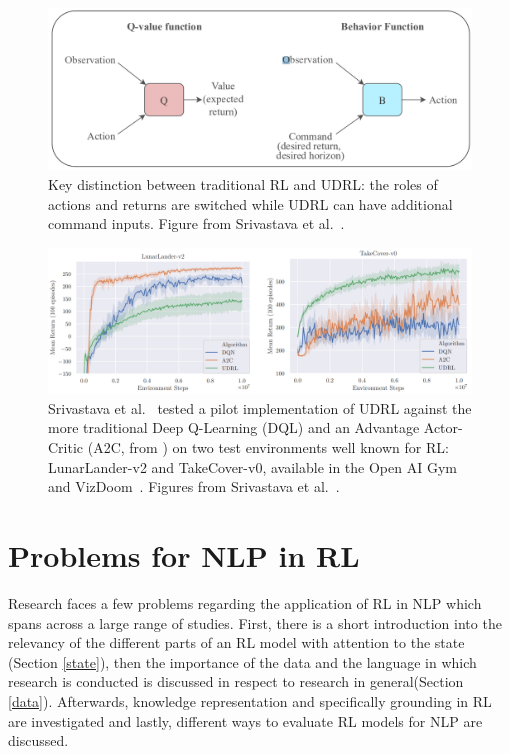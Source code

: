 \documentclass[11pt]{article}
\begin{document}
\begin{figure}[h!]
\centering
\includegraphics[scale=.42]{img/udrl_graphic.PNG}
\caption{Key distinction between traditional RL and UDRL: the roles of actions and returns are switched while UDRL can have additional command inputs. Figure from Srivastava et al.~.}
\label{fig:udrl}
\end{figure}

\begin{figure}[h!]
\centering
\includegraphics[scale=.39]{img/udrl_test_image.PNG}
\caption{Srivastava et al.~ tested a pilot implementation of UDRL against the more traditional Deep Q-Learning (DQL) and an Advantage Actor-Critic (A2C, from \cite{mnih-2015}) on two test environments well known for RL: LunarLander-v2 and TakeCover-v0, available in the Open AI Gym and VizDoom~\cite{openaigym,vizdoom}. Figures from Srivastava et al.~.}
\label{fig:udrl_games}
\end{figure}
\newpage

\section{Problems for NLP in RL}\label{problems}
Research faces a few problems regarding the application of RL in NLP which spans across a large range of studies. First, there is a short introduction into the relevancy of the different parts of an RL model with attention to the state (Section \ref{state}), then the importance of the data and the language in which research is conducted is discussed in respect to research in general(Section \ref{data}). Afterwards, knowledge representation and specifically grounding in RL are investigated and lastly, different ways to evaluate RL models for NLP are discussed.
\end{document}
